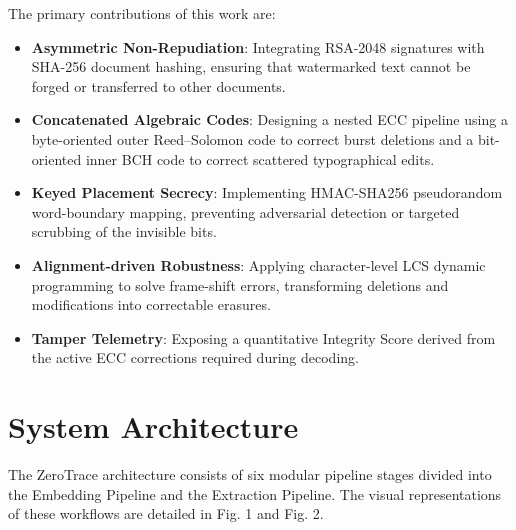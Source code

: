 \documentclass[conference]{IEEEtran}
\begin{document}
The primary contributions of this work are:
\begin{itemize}
    \item \textbf{Asymmetric Non-Repudiation}: Integrating RSA-2048 signatures with SHA-256 document hashing, ensuring that watermarked text cannot be forged or transferred to other documents.
    \item \textbf{Concatenated Algebraic Codes}: Designing a nested ECC pipeline using a byte-oriented outer Reed--Solomon code to correct burst deletions and a bit-oriented inner BCH code to correct scattered typographical edits.
    \item \textbf{Keyed Placement Secrecy}: Implementing HMAC-SHA256 pseudorandom word-boundary mapping, preventing adversarial detection or targeted scrubbing of the invisible bits.
    \item \textbf{Alignment-driven Robustness}: Applying character-level LCS dynamic programming to solve frame-shift errors, transforming deletions and modifications into correctable erasures.
    \item \textbf{Tamper Telemetry}: Exposing a quantitative Integrity Score derived from the active ECC corrections required during decoding.
\end{itemize}

\section{System Architecture}
The ZeroTrace architecture consists of six modular pipeline stages divided into the Embedding Pipeline and the Extraction Pipeline. The visual representations of these workflows are detailed in Fig. 1 and Fig. 2.
\end{document}

